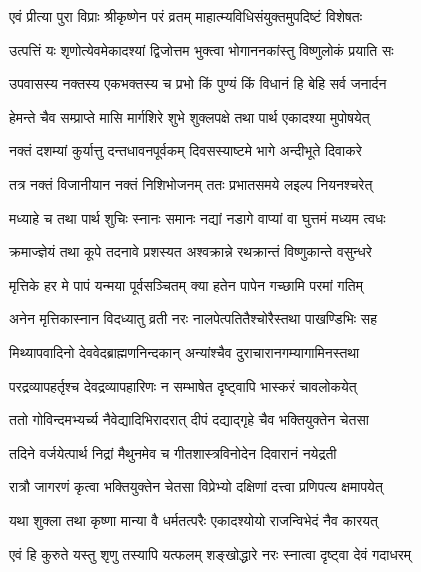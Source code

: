 
\twolineshloka
{एवं प्रीत्या पुरा विप्राः श्रीकृष्णेन परं व्रतम्}
{माहात्म्यविधिसंयुक्तमुपदिष्टं विशेषतः} %

\twolineshloka
{उत्पत्तिं यः शृणोत्येवमेकादश्यां द्विजोत्तम}
{भुक्त्वा भोगाननकांस्तु विष्णुलोकं प्रयाति सः} %


\twolineshloka
{उपवासस्य नक्तस्य एकभक्तस्य च प्रभो}
{किं पुण्यं किं विधानं हि बेहि सर्व जनार्दन} %


\twolineshloka
{हेमन्ते चैव सम्प्राप्ते मासि मार्गशिरे शुभे}
{शुक्लपक्षे तथा पार्थ एकादश्या मुपोषयेत्} %

\twolineshloka
{नक्तं दशम्यां कुर्यात्तु दन्तधावनपूर्वकम्}
{दिवसस्याष्टमे भागे अन्दीभूते दिवाकरे} %

\twolineshloka
{तत्र नक्तं विजानीयान नक्तं निशिभोजनम्}
{ततः प्रभातसमये लइल्प नियनश्चरेत्} %

\twolineshloka
{मध्याहे च तथा पार्थ शुचिः स्नानः समानः}
{नद्यां नडागे वाप्यां वा घुत्तमं मध्यम त्वधः} %

\twolineshloka
{क्रमाज्ज्ञेयं तथा कूपे तदनावे प्रशस्यत}
{अश्वक्रान्ने रथक्रान्तं विष्णुकान्ते वसुन्धरे} %

\twolineshloka
{मृत्तिके हर मे पापं यन्मया पूर्वसञ्चितम्}
{क्या हतेन पापेन गच्छामि परमां गतिम्} %

\twolineshloka
{अनेन मृत्तिकास्नान विदध्यातु व्रती नरः}
{नालपेत्पतितैश्चोरैस्तथा पाखण्डिभिः सह} %

\twolineshloka
{मिथ्यापवादिनो देववेदब्राह्मणनिन्दकान्}
{अन्यांश्चैव दुराचारानगम्यागामिनस्तथा} %

\twolineshloka
{परद्रव्यापहर्तृश्च देवद्रव्यापहारिणः}
{न सम्भाषेत दृष्ट्वापि भास्करं चावलोकयेत्} %

\twolineshloka
{ततो गोविन्दमभ्यर्च्य नैवेद्यादिभिरादरात्}
{दीपं दद्याद्गृहे चैव भक्तियुक्तेन चेतसा} %

\twolineshloka
{तदिने वर्जयेत्पार्थ निद्रां मैथुनमेव च}
{गीतशास्त्रविनोदेन दिवारानं नयेद्रती} %

\twolineshloka
{रात्रौ जागरणं कृत्वा भक्तियुक्तेन चेतसा}
{विप्रेभ्यो दक्षिणां दत्त्वा प्रणिपत्य क्षमापयेत्} %

\twolineshloka
{यथा शुक्ला तथा कृष्णा मान्या वै धर्मतत्परैः}
{एकादश्योयो राजन्विभेदं नैव कारयत्} %

\twolineshloka
{एवं हि कुरुते यस्तु शृणु तस्यापि यत्फलम्}
{शङ्खोद्धारे नरः स्नात्वा दृष्ट्वा देवं गदाधरम्} %

